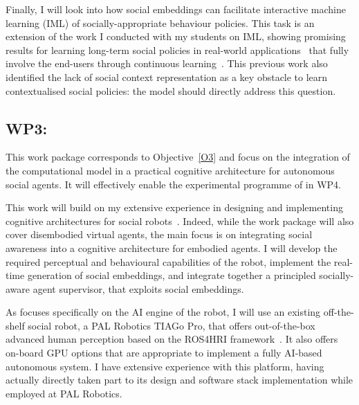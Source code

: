 Finally, I will look into how social embeddings can facilitate interactive
machine learning (IML) of socially-appropriate behaviour policies. This task is
an extension of the work I conducted with my students on IML, showing promising
results for learning long-term social policies in real-world
applications~\cite{senft2019teaching, winkle2020couch} that fully involve the
end-users through continuous learning~\cite{winkle2018social}. This previous
work also identified the lack of social context representation as a key
obstacle to learn contextualised social policies: the \project model should
directly address this question.


\subsection{WP3: \textbf{\WPC} 
           {\footnotesize{}}}

This work package corresponds to Objective~\ref{O3} and focus on the integration
of the \project computational model in a practical cognitive architecture for
autonomous social agents. It will effectively enable the experimental programme
of \project in WP4.

This work will build on my extensive experience in designing and implementing
cognitive architectures for social robots~\cite{lemaignan2017artificial,
lemaignan2015pyrobots,lemaignan2011what}.  Indeed, while the work package will
also cover disembodied virtual agents, the main focus is on integrating social
awareness into a cognitive architecture for embodied agents. I will develop the
required perceptual and behavioural capabilities of the robot, implement the
real-time generation of social embeddings, and integrate together a principled
socially-aware agent supervisor, that exploits social embeddings.

As \project focuses specifically on the AI engine of the robot, I will use an
existing off-the-shelf social robot, a PAL Robotics TIAGo Pro, that offers
out-of-the-box advanced human perception based on the ROS4HRI
framework~\cite{lemaignan2022ros}. It also offers on-board GPU options that are
appropriate to implement a fully AI-based autonomous system. I have extensive
experience with this platform, having actually directly taken part to its design
and software stack implementation while employed at PAL Robotics.

